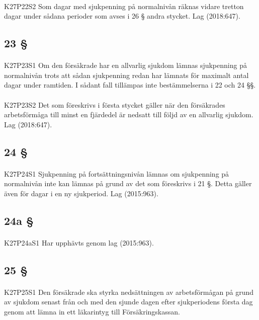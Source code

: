 \documentclass[a4paper,notitlepage,openany,10pt]{book}
\begin{document}
\paragraph*{}
{\tiny K27P22S2}
Som dagar med sjukpenning på normalnivån räknas vidare tretton dagar under sådana perioder som avses i 26 § andra stycket.
Lag (2018:647).
\subsection*{23 §}
\paragraph*{}
{\tiny K27P23S1}
Om den försäkrade har en allvarlig sjukdom lämnas sjukpenning på normalnivån trots att sådan sjukpenning redan har lämnats för maximalt antal dagar under ramtiden. I sådant fall tillämpas inte bestämmelserna i 22 och 24 §§.
\paragraph*{}
{\tiny K27P23S2}
Det som föreskrivs i första stycket gäller när den försäkrades arbetsförmåga till minst en fjärdedel är nedsatt till följd av en allvarlig sjukdom.
Lag (2018:647).
\subsection*{24 §}
\paragraph*{}
{\tiny K27P24S1}
Sjukpenning på fortsättningsnivån lämnas om sjukpenning på normalnivån inte kan lämnas på grund av det som föreskrivs i 21 §. Detta gäller även för dagar i en ny sjukperiod.
Lag (2015:963).
\subsection*{24a §}
\paragraph*{}
{\tiny K27P24aS1}
Har upphävts genom
lag (2015:963).
\subsection*{25 §}
\paragraph*{}
{\tiny K27P25S1}
Den försäkrade ska styrka nedsättningen av arbetsförmågan på grund av sjukdom senast från och med den sjunde dagen efter sjukperiodens första dag genom att lämna in ett läkarintyg till Försäkringskassan.
\end{document}
